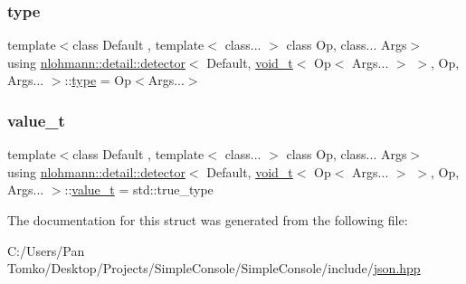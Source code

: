 \subsubsection{\texorpdfstring{type}{type}}
{\footnotesize\ttfamily template$<$class Default , template$<$ class... $>$ class Op, class... Args$>$ \\
using \mbox{\hyperlink{structnlohmann_1_1detail_1_1detector}{nlohmann\+::detail\+::detector}}$<$ Default, \mbox{\hyperlink{namespacenlohmann_1_1detail_a92a167c49c6697b6ffe4f79492c705e5}{void\+\_\+t}}$<$ Op$<$ Args... $>$ $>$, Op, Args... $>$\+::\mbox{\hyperlink{structnlohmann_1_1detail_1_1detector_3_01_default_00_01void__t_3_01_op_3_01_args_8_8_8_01_4_01_4_00_01_op_00_01_args_8_8_8_01_4_a5afd6a40e94dde21d120ac646468c495}{type}} =  Op$<$Args...$>$}

\mbox{\label{structnlohmann_1_1detail_1_1detector_3_01_default_00_01void__t_3_01_op_3_01_args_8_8_8_01_4_01_4_00_01_op_00_01_args_8_8_8_01_4_ab748f9f00bb31bee4978a033589f8c85}} 
\subsubsection{\texorpdfstring{value\_t}{value\_t}}
{\footnotesize\ttfamily template$<$class Default , template$<$ class... $>$ class Op, class... Args$>$ \\
using \mbox{\hyperlink{structnlohmann_1_1detail_1_1detector}{nlohmann\+::detail\+::detector}}$<$ Default, \mbox{\hyperlink{namespacenlohmann_1_1detail_a92a167c49c6697b6ffe4f79492c705e5}{void\+\_\+t}}$<$ Op$<$ Args... $>$ $>$, Op, Args... $>$\+::\mbox{\hyperlink{structnlohmann_1_1detail_1_1detector_3_01_default_00_01void__t_3_01_op_3_01_args_8_8_8_01_4_01_4_00_01_op_00_01_args_8_8_8_01_4_ab748f9f00bb31bee4978a033589f8c85}{value\+\_\+t}} =  std\+::true\+\_\+type}



The documentation for this struct was generated from the following file\+:\begin{DoxyCompactItemize}
\item 
C\+:/\+Users/\+Pan Tomko/\+Desktop/\+Projects/\+Simple\+Console/\+Simple\+Console/include/\mbox{\hyperlink{json_8hpp}{json.\+hpp}}\end{DoxyCompactItemize}
